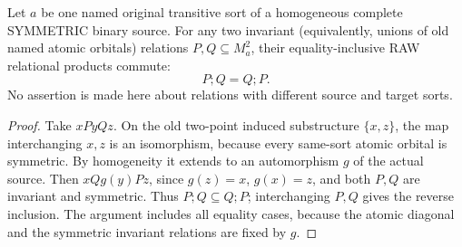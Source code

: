 


\begin{lemma}
\label{lem:typed-symmetric-orbital-commutation}
Let \(a\) be one named original
transitive sort of a homogeneous
complete SYMMETRIC binary source.
For any two invariant (equivalently,
unions of old named atomic orbitals)
relations \(P,Q\subseteq M_a^2\),
their equality-inclusive RAW
relational products commute:
\[
                    P;Q=Q;P.
\]
No assertion is made here about
relations with different source
and target sorts.
\end{lemma}
\begin{proof}
Take \(xP yQ z\).
On the old two-point induced
substructure \(\{x,z\}\), the map
interchanging \(x,z\) is an
isomorphism, because every
same-sort atomic orbital is
symmetric. By homogeneity it
extends to an automorphism
\(g\) of the actual source.
Then \(xQ g(y)Pz\), since
\(g(z)=x\), \(g(x)=z\),
and both \(P,Q\) are invariant
and symmetric. Thus
\(P;Q\subseteq Q;P\);
interchanging \(P,Q\)
gives the reverse inclusion.
The argument includes
all equality cases, because
the atomic diagonal and
the symmetric invariant
relations are fixed by \(g\).
\end{proof}

